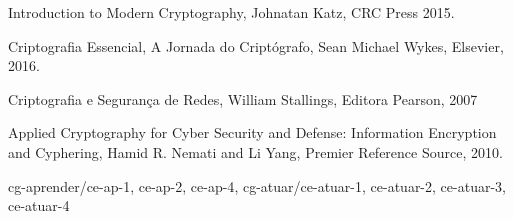 {{        Introduction to Modern Cryptography, Johnatan Katz, CRC Press 2015.

        Criptografia Essencial, A Jornada do Criptógrafo, Sean Michael Wykes, Elsevier, 2016.

        Criptografia e Segurança de Redes, William Stallings, Editora Pearson, 2007

        Applied Cryptography for Cyber Security and Defense: Information Encryption and Cyphering, Hamid R. Nemati and Li Yang, Premier Reference Source, 2010.
    }
    \competencias
    {
        cg-aprender/{ce-ap-1, ce-ap-2, ce-ap-4},
        cg-atuar/{ce-atuar-1, ce-atuar-2, ce-atuar-3, ce-atuar-4}
    }
}